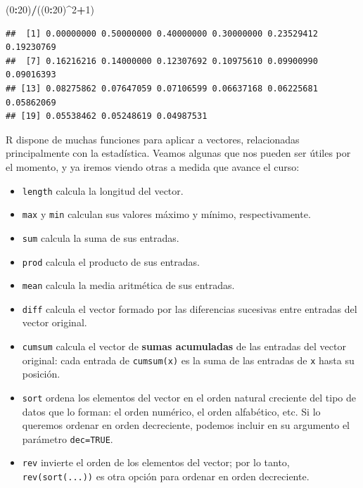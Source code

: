 \documentclass[]{book}
\newenvironment{Shaded}{\begin{snugshade}}{\end{snugshade}}
\newcommand{\DecValTok}[1]{\textcolor[rgb]{0.00,0.00,0.81}{#1}}
\newcommand{\NormalTok}[1]{#1}
\newcommand{\OperatorTok}[1]{\textcolor[rgb]{0.81,0.36,0.00}{\textbf{#1}}}
\providecommand{\tightlist}{%
  \setlength{\itemsep}{0pt}\setlength{\parskip}{0pt}}
\theoremstyle{definition}
\theoremstyle{definition}
\theoremstyle{definition}
\theoremstyle{remark}
\begin{document}
\begin{Shaded}
\begin{Highlighting}[]
\NormalTok{(}\DecValTok{0}\OperatorTok{:}\DecValTok{20}\NormalTok{)}\OperatorTok{/}\NormalTok{((}\DecValTok{0}\OperatorTok{:}\DecValTok{20}\NormalTok{)}\OperatorTok{^}\DecValTok{2}\OperatorTok{+}\DecValTok{1}\NormalTok{)}
\end{Highlighting}
\end{Shaded}

\begin{verbatim}
##  [1] 0.00000000 0.50000000 0.40000000 0.30000000 0.23529412 0.19230769
##  [7] 0.16216216 0.14000000 0.12307692 0.10975610 0.09900990 0.09016393
## [13] 0.08275862 0.07647059 0.07106599 0.06637168 0.06225681 0.05862069
## [19] 0.05538462 0.05248619 0.04987531
\end{verbatim}

R dispone de muchas funciones para aplicar a vectores, relacionadas principalmente con la estadística. Veamos algunas que nos pueden ser útiles por el momento, y ya iremos viendo otras a medida que avance el curso:

\begin{itemize}
\tightlist
\item
  \texttt{length} calcula la longitud del vector.
\item
  \texttt{max} y \texttt{min} calculan sus valores máximo y mínimo, respectivamente.
\item
  \texttt{sum} calcula la suma de sus entradas.
\item
  \texttt{prod} calcula el producto de sus entradas.
\item
  \texttt{mean} calcula la media aritmética de sus entradas.
\item
  \texttt{diff} calcula el vector formado por las diferencias sucesivas entre entradas del vector original.
\item
  \texttt{cumsum} calcula el vector de \textbf{sumas acumuladas} de las entradas del vector original: cada entrada de \texttt{cumsum(x)} es la suma de las entradas de \texttt{x} hasta su posición.
\item
  \texttt{sort} ordena los elementos del vector en el orden natural creciente del tipo de datos que lo forman: el orden numérico, el orden alfabético, etc. Si lo queremos ordenar en orden decreciente, podemos incluir en su argumento el parámetro \texttt{dec=TRUE}.
\item
  \texttt{rev} invierte el orden de los elementos del vector; por lo tanto, \texttt{rev(sort(...))} es otra opción para ordenar en orden decreciente.
\end{itemize}
\end{document}
